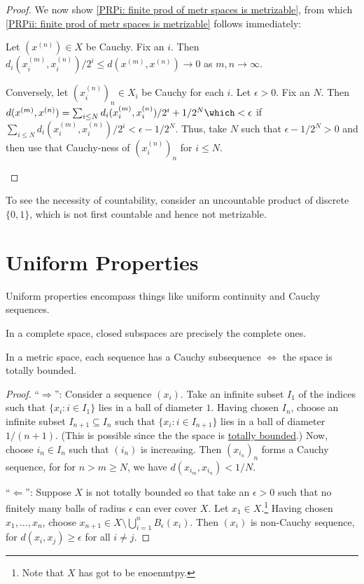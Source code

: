 \begin{proof}
		We now show \ref{PRPi: finite prod of metr spaces is metrizable}, from which \ref{PRPii: finite prod of metr spaces is metrizable} follows immediately:
		\begin{subproof}
			Let $(x^{(n)})\in X$ be Cauchy. Fix an $i$. Then $d_i(x^{(m)}_i, x^{(n)}_i)/2^i\le d(x^{(m)}, x^{(n)})\to 0$ as $m, n\to\infty$.
			
			Conversely, let $(x^{(n)}_i)_n\in X_i$ be Cauchy for each $i$. Let $\epsilon > 0$. Fix an $N$. Then $d(x^{(m)}, x^{(n)}) = \sum_{i\le N} d_i(x^{(m)}_i, x^{(n)}_i)/2^i + 1/2^N\which < \epsilon$ if $\sum_{i\le N} d_i(x^{(m)}_i, x^{(n)}_i)/2^i < \epsilon - 1/2^N$. Thus, take $N$ such that $\epsilon - 1/2^N > 0$ and then use that Cauchy-ness of $(x^{(n)}_i)_n$ for $i\le N$.
		\end{subproof}
	\end{proof}
	
	\begin{rmk}
		To see the necessity of countability, consider an uncountable product of discrete $\{0, 1\}$, which is not first countable and hence not metrizable.
	\end{rmk}
	

	
	

\section{Uniform Properties}

Uniform properties encompass things like uniform continuity and Cauchy sequences.


	\begin{lem}\label{LEM: closed subsets in complete spaces}
		In a complete space, closed subspaces are precisely the complete ones.
	\end{lem}
	
	
	\begin{lem}
		In a metric space, each sequence has a Cauchy subsequence $\iff$ the space is totally bounded.
	\end{lem}
	
	\begin{proof}
		``$\Rightarrow$'': Consider a sequence $(x_i)$. Take an infinite subset $I_1$ of the indices such that $\{x_i : i\in I_1\}$ lies in a ball of diameter $1$. Having chosen $I_n$, choose
		an infinite subset $I_{n + 1}\subseteq I_n$ such that $\{x_i : i\in I_{n + 1}\}$ lies in a ball of diameter $1/(n + 1)$. (This is possible since the the space is \uline{totally bounded}.) Now, choose $i_n\in I_n$ such that $(i_n)$ is increasing. Then $(x_{i_n})_n$ forms a Cauchy sequence, for for $n > m\ge N$, we have $d(x_{i_m}, x_{i_n}) < 1/N$.
		
		``$\Leftarrow$'': Suppose $X$ is not totally bounded so that take an $\epsilon > 0$ such that no finitely many balls of radius $\epsilon$ can ever cover $X$. Let $x_1\in X$.\footnote{
			Note that $X$ has got to be enoenmtpy.}
		Having chosen $x_1, \ldots, x_n$, choose
		$x_{n + 1}\in X\setminus\bigcup_{i = 1}^n B_\epsilon(x_i)$. Then $(x_i)$ is non-Cauchy sequence, for $d(x_i, x_j)\ge \epsilon$ for all $i\ne j$.
	\end{proof}
	
